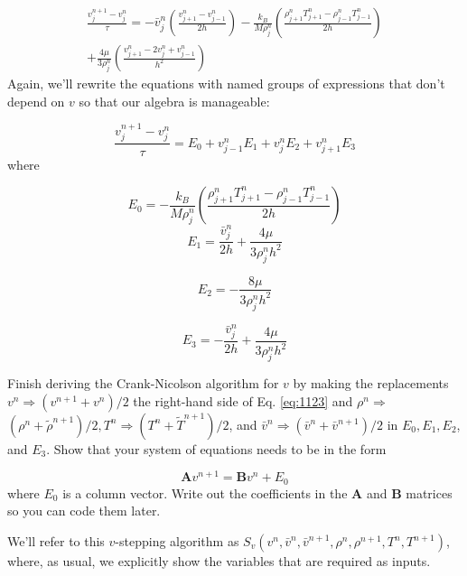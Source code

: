 \begin{equation}\label{eq:1122}
\begin{array}{r}
\frac{v_{j}^{n+1}-v_{j}^{n}}{\tau}=-\bar{v}_{j}^{n}\left(\frac{v_{j+1}^{n}-v_{j-1}^{n}}{2 h}\right)-\frac{k_{B}}{M \rho_{j}^{n}}\left(\frac{\rho_{j+1}^{n} T_{j+1}^{n}-\rho_{j-1}^{n} T_{j-1}^{n}}{2 h}\right) \\
+\frac{4 \mu}{3 \rho_{j}^{n}}\left(\frac{v_{j+1}^{n}-2 v_{j}^{n}+v_{j-1}^{n}}{h^{2}}\right)
\end{array}
\end{equation}
Again, we\rq ll rewrite the equations with named groups of expressions that don\rq t
depend on $v$ so that our algebra is manageable:


\begin{equation}\label{eq:1123}
\frac{v_{j}^{n+1}-v_{j}^{n}}{\tau}=E_{0}+v_{j-1}^{n} E_{1}+v_{j}^{n} E_{2}+v_{j+1}^{n} E_{3}
\end{equation}
where

\begin{equation}\label{eq:1124}
E_{0}=-\frac{k_{B}}{M \rho_{j}^{n}}\left(\frac{\rho_{j+1}^{n} T_{j+1}^{n}-\rho_{j-1}^{n} T_{j-1}^{n}}{2 h}\right)
\end{equation}
\begin{equation}\label{eq:1125}
E_{1}=\frac{\bar{v}_{j}^{n}}{2 h}+\frac{4 \mu}{3 \rho_{j}^{n} h^{2}}
\end{equation}

\begin{equation}\label{eq:1126}
E_{2}=-\frac{8 \mu}{3 \rho_{j}^{n} h^{2}}
\end{equation}

\begin{equation}\label{eq:1127}
E_{3}=-\frac{\bar{v}_{j}^{n}}{2 h}+\frac{4 \mu}{3 \rho_{j}^{n} h^{2}}
\end{equation}

\begin{problem}\label{P11.2}
Finish deriving the Crank-Nicolson algorithm for $v$ by making the replacements $v^{n} \Rightarrow\left(v^{n+1}+v^{n}\right) / 2$ the right-hand side of Eq. \eqref{eq:1123} and $\rho^{n} \Rightarrow$ $\left(\rho^{n}+\tilde{\rho}^{n+1}\right) / 2, T^{n} \Rightarrow\left(T^{n}+\tilde{T}^{n+1}\right) / 2$, and $\bar{v}^{n} \Rightarrow\left(\bar{v}^{n}+\bar{v}^{n+1}\right) / 2$ in $E_{0}, E_{1}, E_{2}$, and $E_{3}$. Show that your system of equations needs to be in the form

\begin{equation*}
\mathbf{A} v^{n+1}=\mathbf{B} v^{n}+E_{0}
\end{equation*}
where $E_{0}$ is a column vector. Write out the coefficients in the $\mathbf{A}$ and $\mathbf{B}$ matrices so you can code them later.
\end{problem}
We\rq ll refer to this $v$-stepping algorithm as $S_{v}\left(v^{n}, \bar{v}^{n}, \bar{v}^{n+1}, \rho^{n}, \rho^{n+1}, T^{n}, T^{n+1}\right)$, where, as usual, we explicitly show the variables that are required as inputs.
